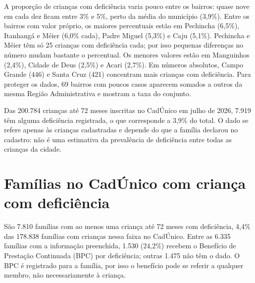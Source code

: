 
A proporção de crianças com deficiência varia pouco entre os bairros: quase nove em cada dez ficam entre 3\% e 5\%, perto da média do município (3,9\%). Entre os bairros com valor próprio, os maiores percentuais estão em Pechincha (6,5\%), Itanhangá e Méier (6,0\% cada), Padre Miguel (5,3\%) e Caju (5,1\%). Pechincha e Méier têm só 25 crianças com deficiência cada; por isso pequenas diferenças no número mudam bastante o percentual. Os menores valores estão em Manguinhos (2,4\%), Cidade de Deus (2,5\%) e Acari (2,7\%). Em números absolutos, Campo Grande (446) e Santa Cruz (421) concentram mais crianças com deficiência. Para proteger os dados, 69 bairros com poucos casos aparecem somados a outros da mesma Região Administrativa e mostram a taxa do conjunto.



Das 200.784 crianças até 72 meses inscritas no CadÚnico em julho de 2026, 7.919 têm alguma deficiência registrada, o que corresponde a 3,9\% do total. O dado se refere apenas às crianças cadastradas e depende do que a família declarou no cadastro: não é uma estimativa da prevalência de deficiência entre todas as crianças da cidade.


\section{Famílias no CadÚnico com criança com deficiência}



São 7.810 famílias com ao menos uma criança até 72 meses com deficiência, 4,4\% das 178.838 famílias com crianças nessa faixa no CadÚnico. Entre as 6.335 famílias com a informação preenchida, 1.530 (24,2\%) recebem o Benefício de Prestação Continuada (BPC) por deficiência; outras 1.475 não têm o dado. O BPC é registrado para a família, por isso o benefício pode se referir a qualquer membro, não necessariamente à criança.

